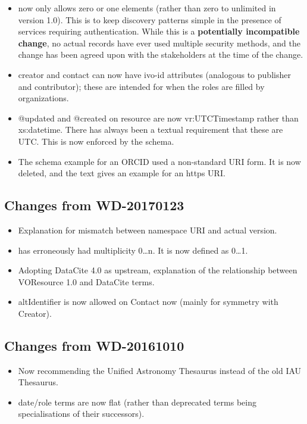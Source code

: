 \documentclass[11pt,a4paper]{ivoa}
\begin{document}
\begin{itemize}
\item {} now only allows zero or one
 elements (rather than zero to unlimited in
version 1.0).  This is to keep discovery patterns simple in the presence
of services requiring authentication.  While this is a
\textbf{potentially incompatible change}, no actual records have ever
used multiple security methods, and the change has been agreed upon with
the stakeholders at the time of the change.
\item creator and contact can now have ivo-id attributes (analogous
to publisher and contributor); these are intended for when the roles are
filled by organizations.
\item @updated and @created on resource are now vr:UTCTimestamp rather
than xs:datetime.  There has always been a textual requirement that
these are UTC.  This is now enforced by the schema.
\item The schema example for an ORCID used a non-standard URI form.  It
is now deleted, and the text gives an example for an https URI.
\end{itemize}

\subsection{Changes from WD-20170123}

\begin{itemize}
\item Explanation for mismatch between namespace URI and actual version.
\item {} has erroneously had multiplicity 0\dots n.
It is now defined as 0\dots 1.
\item Adopting DataCite 4.0 as upstream, explanation of the relationship
between VOResource 1.0 and DataCite terms.
\item altIdentifier is now allowed on Contact now (mainly for symmetry
with Creator).
\end{itemize}

\subsection{Changes from WD-20161010}

\begin{itemize}
\item Now recommending the Unified Astronomy Thesaurus instead of the
old IAU Thesaurus.
\item date/role terms are now flat (rather than deprecated terms being
specialisations of their successors).
\end{itemize}
\end{document}
